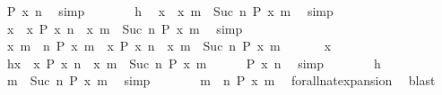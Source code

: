 \begin{isabellebody}
\ {\isacartoucheopen}P\ x\ n{\isacartoucheclose}\ \isamarkupfalse%
\ simp\isanewline
\ \ \ \ \isamarkupfalse%
\ \isamarkupfalse%
\ h\ \isamarkupfalse%
\ {\isacartoucheopen}x\ {\isasymin}\ {\isacharbraceleft}x{\isachardot}\ {\isasymforall}m\ {\isasymge}\ Suc\ n{\isachardot}\ P\ x\ m{\isacharbraceright}{\isacartoucheclose}\ \isamarkupfalse%
\ simp\isanewline
\ \ \ \ \isamarkupfalse%
\ \isamarkupfalse%
\ {\isacartoucheopen}x\ {\isasymin}\ {\isacharbraceleft}x{\isachardot}\ P\ x\ n{\isacharbraceright}\ {\isasyminter}\ {\isacharbraceleft}x{\isachardot}\ {\isasymforall}m\ {\isasymge}\ Suc\ n{\isachardot}\ P\ x\ m{\isacharbraceright}{\isacartoucheclose}\ \isamarkupfalse%
\ simp\isanewline
\ \ \isacommand{{\isacharbraceright}}\isamarkupfalse%
\ \isamarkupfalse%
\ {\isacartoucheopen}{\isacharbraceleft}x{\isachardot}\ {\isasymforall}m\ {\isasymge}\ n{\isachardot}\ P\ x\ m{\isacharbraceright}\ {\isasymsubseteq}\ {\isacharbraceleft}x{\isachardot}\ P\ x\ n{\isacharbraceright}\ {\isasyminter}\ {\isacharbraceleft}x{\isachardot}\ {\isasymforall}m\ {\isasymge}\ Suc\ n{\isachardot}\ P\ x\ m{\isacharbraceright}{\isacartoucheclose}\ \isacommand{{\isachardot}{\isachardot}}\isamarkupfalse%
\isanewline
{}\isamarkupfalse%
\isanewline
\ \ \isacommand{{\isacharbraceleft}}\isamarkupfalse%
\ \isamarkupfalse%
\ x\isanewline
\ \ \ \ \isamarkupfalse%
\ h{\isacharcolon}{\isacartoucheopen}x\ {\isasymin}\ {\isacharbraceleft}x{\isachardot}\ P\ x\ n{\isacharbraceright}\ {\isasyminter}\ {\isacharbraceleft}x{\isachardot}\ {\isasymforall}m\ {\isasymge}\ Suc\ n{\isachardot}\ P\ x\ m{\isacharbraceright}{\isacartoucheclose}\isanewline
\ \ \ \ \isamarkupfalse%
\ {\isacartoucheopen}P\ x\ n{\isacartoucheclose}\ \isamarkupfalse%
\ simp\isanewline
\ \ \ \ \isamarkupfalse%
\ \isamarkupfalse%
\ h\ \isamarkupfalse%
\ {\isacartoucheopen}{\isasymforall}m\ {\isasymge}\ Suc\ n{\isachardot}\ P\ x\ m{\isacartoucheclose}\ \isamarkupfalse%
\ simp\isanewline
\ \ \ \ \isamarkupfalse%
\ \isamarkupfalse%
\ {\isacartoucheopen}{\isasymforall}m\ {\isasymge}\ n{\isachardot}\ P\ x\ m{\isacartoucheclose}\ \isamarkupfalse%
\ forall{\isacharunderscore}nat{\isacharunderscore}expansion\ \isamarkupfalse%
\ blast\isanewline
\ \ \ \ \isamarkupfalse%

\end{isabellebody}
